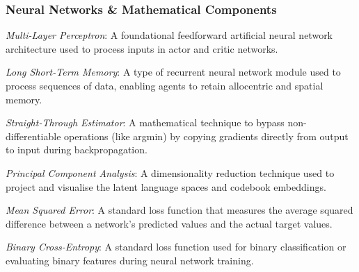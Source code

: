 {\vspace{-5pt}
\subsubsection*{Neural Networks \& Mathematical Components}
\begin{description}[labelwidth=2cm, leftmargin=2.2cm, style=multiline, noitemsep, topsep=0pt]
    \item[MLP] \textit{Multi-Layer Perceptron}: A foundational feedforward artificial neural network architecture used to process inputs in actor and critic networks.
    \item[LSTM] \textit{Long Short-Term Memory}: A type of recurrent neural network module used to process sequences of data, enabling agents to retain allocentric and spatial memory.
    \item[STE] \textit{Straight-Through Estimator}: A mathematical technique to bypass non-differentiable operations (like argmin) by copying gradients directly from output to input during backpropagation.
    \item[PCA] \textit{Principal Component Analysis}: A dimensionality reduction technique used to project and visualise the latent language spaces and codebook embeddings.
    \item[MSE] \textit{Mean Squared Error}: A standard loss function that measures the average squared difference between a network's predicted values and the actual target values.
    \item[BCE] \textit{Binary Cross-Entropy}: A standard loss function used for binary classification or evaluating binary features during neural network training.
\end{description}
}
